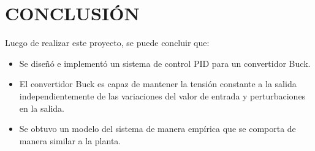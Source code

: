 \section*{\large{CONCLUSIÓN}}
\vspace{-0.35cm}
\justifying

Luego de realizar este proyecto, se puede concluir que:

\begin{itemize}[noitemsep]
    \item Se diseñó e implementó un sistema de control PID para un convertidor Buck.
    \item El convertidor Buck es capaz de mantener la tensión constante a la salida independientemente de las variaciones del valor de entrada
    y perturbaciones en la salida.
    \item Se obtuvo un modelo del sistema de manera empírica que se comporta de manera similar a la planta.
\end{itemize}